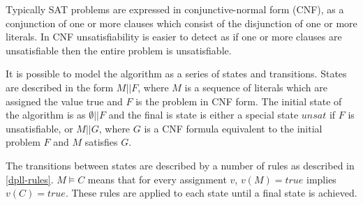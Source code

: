 \documentclass[]{final_report}
\begin{document}
Typically SAT problems are expressed in conjunctive-normal form (CNF), as a conjunction of one or more clauses which consist of the disjunction of one or more literals. In CNF unsatisfiability is easier to detect as if one or more clauses are unsatisfiable then the entire problem is unsatisfiable.

It is possible to model the algorithm as a series of states and transitions. States are described in the form $M || F$, where $M$ is a sequence of literals which are assigned the value true and $F$ is the problem in CNF form. The initial state of the algorithm is as $\emptyset || F $ and the final is state is either a special state $unsat$ if $F$ is unsatisfiable, or $M || G $, where $G$ is a CNF formula equivalent to the initial problem $F$ and $M$ satisfies $G$. 

The transitions between states are described by a number of rules as described in \ref{dpll-rules}. $M \models C$  means that for every assignment $v$, $v(M) = true$ implies $v(C) = true$. These rules are applied to each state until a final state is achieved.
\end{document}
